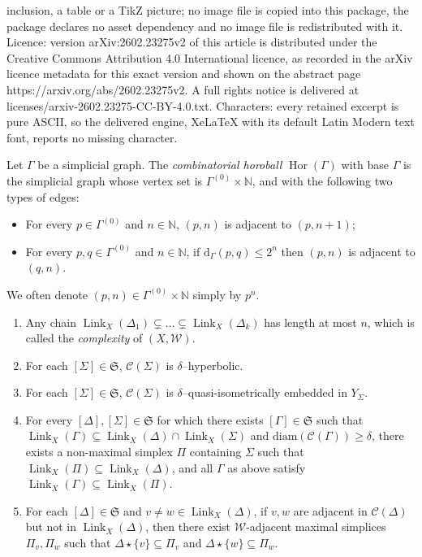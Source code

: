 \documentclass[10pt,a4paper]{amsart}
\newcommand{\C}[1]{\mathcal{C}(#1)}
\newcommand{\Hor}[1]{\operatorname{Hor}\left(#1\right)}
\newcommand{\N}{\mathbb{N}}
\newcommand{\W}{\mathcal{W}}
\newcommand{\diam}{\mathrm{diam}}
\newcommand{\dist}{\mathrm{d}}
\newcommand{\frakS}{\mathfrak S}
\newcommand{\link}[2]{\operatorname{Link}_{#1}\left(#2\right)}
\begin{document}
inclusion, a table or a TikZ picture; no image file is copied into this package, the package declares no asset dependency and no image file is redistributed with it. Licence: version arXiv:2602.23275v2 of this article is distributed under the Creative Commons Attribution 4.0 International licence, as recorded in the arXiv licence metadata for this exact version and shown on the abstract page https://arxiv.org/abs/2602.23275v2. A full rights notice is delivered at licenses/arxiv-2602.23275-CC-BY-4.0.txt. Characters: every retained excerpt is pure ASCII, so the delivered engine, XeLaTeX with its default Latin Modern text font, reports no missing character.
\begin{defn}\label{def:horoball}
Let $\Gamma$ be a simplicial graph. The \emph{combinatorial horoball} $\Hor{\Gamma}$ with base $\Gamma$ is the simplicial graph whose vertex set is $\Gamma^{(0)}\times \N$, and with the following two types of edges:
\begin{itemize}
\item For every $p\in \Gamma^{(0)}$ and $n\in \N$, $(p,n)$ is adjacent to $(p, n+1)$;
\item For every $p,q\in \Gamma^{(0)}$ and $n\in \N$, if $\dist_{\Gamma}(p,q)\le 2^n$ then $(p,n)$ is adjacent to $(q,n)$.
\end{itemize}
We often denote $(p,n)\in \Gamma^{(0)}\times \N$ simply by $p^n$. 
\end{defn}

\begin{enumerate}[label=(\arabic*)]
\item \label{CHHS_def_complexity} Any chain $\link{X}{\Delta_1}\subsetneq\dots\subsetneq\link{X}{\Delta_k}$ has length at most $n$, which is called the \emph{complexity} of $(X,\W)$.
\item \label{CHHS_def_hyperbolicity} For each $[\Sigma]\in \frakS$,  $\C{\Sigma}$ is $\delta$--hyperbolic.
\item \label{CHHS_def_qi_emb} For each $[\Sigma]\in \frakS$, $\C{\Sigma}$ is $\delta$--quasi-isometrically embedded in $Y_\Sigma$.
\item \label{CHHS_def_lk_cap_lk} For every $[\Delta],[\Sigma]\in \frakS$ for which there exists $[\Gamma]\in\frakS$ such that $\link{X}{\Gamma}\subseteq \link{X}{\Delta}\cap \link{X}{\Sigma}$ and $\diam(\C{\Gamma})\geq \delta$, there exists a non-maximal simplex $\Pi$ containing $\Sigma$ such that $\link{X}{\Pi}\subseteq \link{X}{\Delta}$, and all $\Gamma$ as above satisfy $\link{X}{\Gamma}\subseteq \link{X}{\Pi}$.
\item \label{CHHS_def_edge_in_link} For each $[\Delta]\in \frakS$ and $v\neq w\in \link{X}{\Delta}$, if $v,w$ are adjacent in $\C{\Delta}$ but not in $\link{X}{\Delta}$, then there exist $\mathcal W$-adjacent maximal simplices $\Pi_v,\Pi_w$ such that $\Delta\star \{v\}\subseteq \Pi_v$ and $\Delta\star \{w\}\subseteq \Pi_w$.
\end{enumerate}
\end{document}
